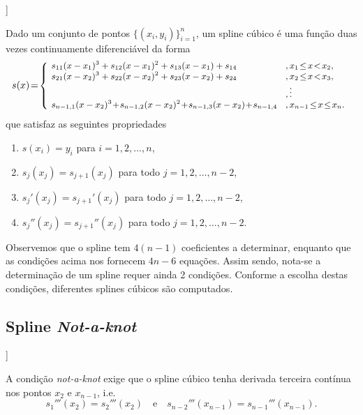 \begin{flushleft}
  [[tag:revisar]]
\end{flushleft}

Dado um conjunto de pontos $\{(x_i,y_i)\}_{i=1}^n$, um spline cúbico é uma função duas vezes continuamente diferenciável da forma
\begin{equation}
  \begin{small}
    s(x)\!=\!\left\{
      \begin{array}{ll}
        \!s_{11}(x-x_1)^3 + s_{12}(x-x_1)^2 + s_{13}(x-x_1) + s_{14} &,x_1\!\leq\!x\!<\!x_2,\\
        \!s_{21}(x-x_2)^3 + s_{22}(x-x_2)^2 + s_{23}(x-x_2) + s_{24} &,x_2\!\leq\!x\!<\!x_3,\\
                                                                   &, \vdots \\
        \!s_{n-1,1}(x-x_2)^3\!+\!s_{n-1,2}(x-x_2)^2\!+\!s_{n-1,3}(x-x_2)\!+\!s_{n-1,4}\!&,x_{n-1}\!\leq\!x\!\leq\!x_n.
      \end{array}
    \right.
  \end{small}
\end{equation}
que satisfaz as seguintes propriedades
\begin{enumerate}
\item $s(x_i) = y_i$ para $i=1, 2, \dotsc, n$,
\item $s_j(x_j) = s_{j+1}(x_j)$ para todo $j=1,2,\dotsc,n-2$,
\item $s_j'(x_j) = s_{j+1}'(x_j)$ para todo $j=1,2,\dotsc,n-2$,  
\item $s_j''(x_j) = s_{j+1}''(x_j)$ para todo $j=1,2,\dotsc,n-2$.
\end{enumerate}

Observemos que o spline tem $4(n-1)$ coeficientes a determinar, enquanto que as condições acima nos fornecem $4n-6$ equações. Assim sendo, nota-se a determinação de um spline requer ainda 2 condições. Conforme a escolha destas condições, diferentes splines cúbicos são computados.

\subsection{Spline {\it Not-a-knot}}

\begin{flushleft}
  [[tag:revisar]]
\end{flushleft}

A condição {\it not-a-knot} exige que o spline cúbico tenha derivada terceira contínua nos pontos $x_2$ e $x_{n-1}$, i.e.
\begin{equation}
  s_1'''(x_2) = s_2'''(x_2)\quad\text{e}\quad s_{n-2}'''(x_{n-1}) = s_{n-1}'''(x_{n-1}).
\end{equation}

